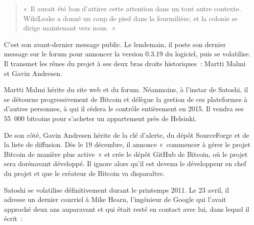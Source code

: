 \begin{quote}
«~Il aurait été bon d'attirer cette attention dans un tout autre contexte. WikiLeaks a donné un coup de pied dans la fourmilière, et la colonie se dirige maintenant vers nous.~»
\end{quote}

C'est son avant-dernier message public. Le lendemain, il poste son dernier message sur le forum pour annoncer la version 0.3.19 du logiciel, puis se volatilise. Il transmet les rênes du projet à ses deux bras droits historiques~: Martti Malmi et Gavin Andresen.

Martti Malmi hérite du site web et du forum. Néanmoins, à l'instar de Satoshi, il se détourne progressivement de Bitcoin et délègue la gestion de ces plateformes à d'autres personnes, à qui il cèdera le contrôle entièrement en 2015. Il vendra ses 55~000 bitcoins pour s'acheter un appartement près de Helsinki.

De son côté, Gavin Andresen hérite de la clé d'alerte, du dépôt SourceForge et de la liste de diffusion. Dès le 19 décembre, il annonce «~commencer à gérer le projet Bitcoin de manière plus active~» et crée le dépôt GitHub de Bitcoin, où le projet sera dorénavant développé. Il ignore alors qu'il est devenu le développeur en chef du projet et que le créateur de Bitcoin va disparaître.

Satoshi se volatilise définitivement durant le printemps 2011. Le 23 avril, il adresse un dernier courriel à Mike Hearn, l'ingénieur de Google qui l'avait approché deux ans auparavant et qui était resté en contact avec lui, dans lequel il écrit~:

